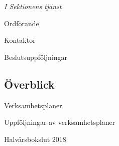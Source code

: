 \documentclass[10pt]{article}
\def\ordf{Daniel Bakic}
\def\sekr{Axel Voss}
\begin{document}
\begin{signatures}{2}
    \emph{I Sektionens tjänst}
    \signature{\ordf}{Ordförande}
    \signature{\sekr}{Kontaktor}
\end{signatures}


\newpage
{}



\newpage

\begin{supersection}{Beslutsuppföljningar}{}
    \subsection{Överblick}
    \begin{busek}

    \end{busek}

\newpage


\end{supersection}

\begin{utskottsrapporter}


\end{utskottsrapporter}
    
\begin{supersection}{Verksamhetsplaner}{}

\end{supersection}
    
\begin{supersection}{Uppföljningar av verksamhetsplaner}{}

\end{supersection}
    
\begin{motioner}

\end{motioner}
    
\begin{propositioner}

\end{propositioner}
    
\begin{supersection}{Halvårsbokslut 2018}{}

\end{supersection}
\end{document}
